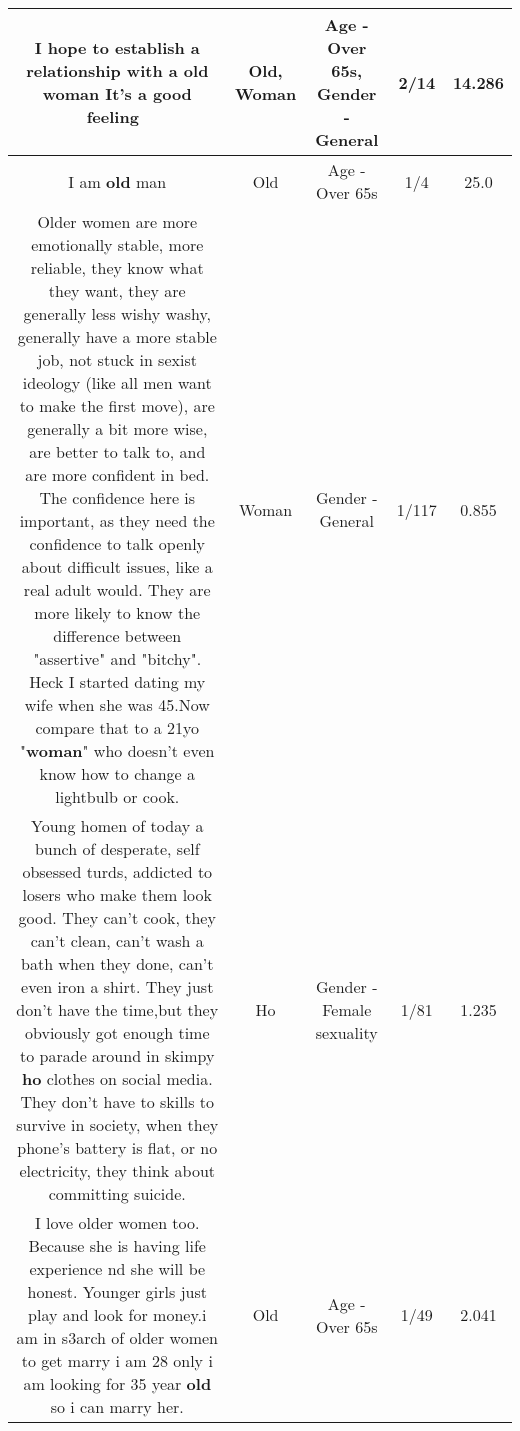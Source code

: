 \documentclass[11pt]{article}
\newlength\mylength
\begin{document}
\begin{center}
\begin{longtable}{|C{.65\mylength}|C{.30\mylength}|C{.12\mylength}|C{.12\mylength}|C{.12\mylength}|}
  \small I hope to establish a relationship with a \textbf{old} \textbf{woman} It's a good feeling🙈🙈\normalsize   & Old, Woman & Age - Over 65s, Gender - General & 2/14 & 14.286 \\  \hline
  \small I am \textbf{old} man\normalsize   & Old & Age - Over 65s & 1/4 & 25.0 \\  \hline
  \small Older women are more emotionally stable, more reliable, they know what they want, they are generally less wishy washy, generally have a more stable job, not stuck in sexist ideology (like all men want to make the first move), are generally a bit more wise, are better to talk to, and are more confident in bed. The confidence here is important, as they need the confidence to talk openly about difficult issues, like a real adult would. They are more likely to know the difference between "assertive" and "bitchy". Heck I started dating my wife when she was 45.Now compare that to a 21yo "\textbf{woman}" who doesn't even know how to change a lightbulb or cook.\normalsize   & Woman & Gender - General & 1/117 & 0.855 \\  \hline
  \small Young homen of today a bunch of desperate, self obsessed turds, addicted to losers who make them look good. They can't cook, they can't clean, can't wash a bath when they done, can't even iron a shirt. They just don't have the time,but they obviously got enough time to parade around in skimpy \textbf{ho} clothes on social media. They don't have to skills to survive in society, when they phone's battery is flat, or no electricity, they think about committing suicide.\normalsize   & Ho & Gender - Female sexuality & 1/81 & 1.235 \\  \hline
  \small I love older women too. Because she is having life experience nd she will be honest. Younger girls just play and look for money.i am in s3arch of older women to get marry i am 28 only i am looking for 35 year \textbf{old} so i can marry her.\normalsize   & Old & Age - Over 65s & 1/49 & 2.041 \\  \hline

\end{longtable}
\end{center}
\end{document}
